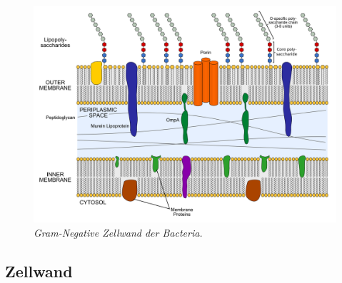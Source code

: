 \begin{description}
		\begin{figure}[ht!]
		\leavevmode
		\begin{center}
			\includegraphics[scale=0.25]{./pictures/gram_negative_zw_noLegend}
		\end{center}
		\caption{\slshape{Gram-Negative Zellwand der Bacteria.}}
		\label{fig:gramNegBacZW}
		\end{figure}
\end{description}

\subsection{Zellwand}
